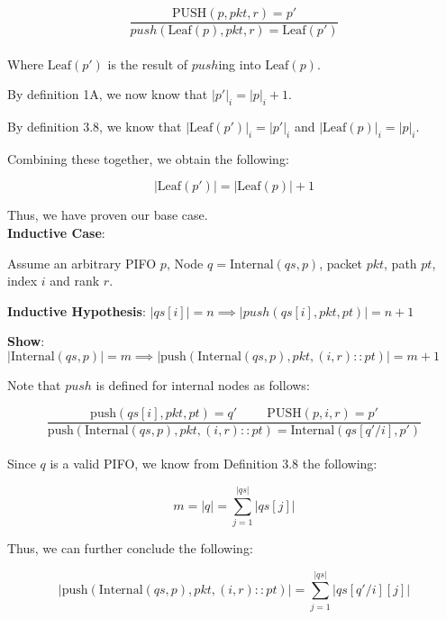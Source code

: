 \documentclass{article}
\begin{document}
$$\frac{\text{PUSH}(p, pkt, r) = p'}{push(\text{Leaf}(p), pkt, r) = \text{Leaf}(p')}$$\\[-10pt]

\noindent Where $\text{Leaf}(p')$ is the result of $push$ing into $\text{Leaf}(p)$.\newline

\noindent By definition 1A, we now know that $|p'|_i = |p|_i + 1$.\newline

\noindent By definition 3.8, we know that $|\text{Leaf}(p')|_i = |p'|_i$ and $|\text{Leaf}(p)|_i = |p|_i$.\newline

\noindent Combining these together, we obtain the following:

$$|\text{Leaf}(p')| = |\text{Leaf}(p)| + 1$$

\noindent Thus, we have proven our base case.\\[10pt]

\noindent \textbf{Inductive Case}:\newline

\noindent Assume an arbitrary PIFO $p$, Node $q = \text{Internal}(qs, p)$, packet $pkt$, path $pt$, index $i$ and rank $r$.\newline

\noindent \textbf{Inductive Hypothesis}: $|qs[i]| = n \implies |push(qs[i], pkt, pt)| = n+1$\newline

\noindent \textbf{Show}: $|\text{Internal}(qs, p)| = m \implies |\text{push}(\text{Internal}(qs, p), pkt, (i, r) :: pt)| = m+1$\newline

\noindent Note that $push$ is defined for internal nodes as follows:

$$\frac{\text{push}(qs[i], pkt, pt) = q' \hspace{1cm} \text{PUSH}(p, i, r) = p'}{\text{push}(\text{Internal}(qs, p), pkt, (i, r) :: pt) = \text{Internal}(qs[q'/i], p')}$$\\[-10pt]

\noindent Since $q$ is a valid PIFO, we know from Definition 3.8 the following:

$$m = |q| = \sum_{j=1}^{|qs|} |qs[j]|$$

\noindent Thus, we can further conclude the following:

$$|\text{push}(\text{Internal}(qs, p), pkt, (i, r) :: pt)| = \sum_{j=1}^{|qs|} |qs[q'/i][j]|$$
\end{document}

